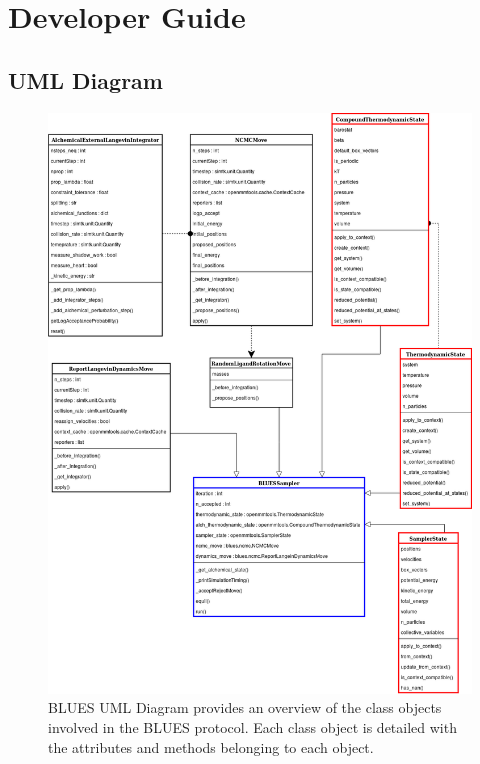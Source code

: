 \hypertarget{developer-guide}{%
\section{Developer Guide}\label{developer-guide}}

\hypertarget{uml-diagram}{%
\subsection{UML Diagram}\label{uml-diagram}}

\begin{figure}
    \centering
    \includegraphics[width=\textwidth,height=\textheight,keepaspectratio]{blues-docs/images/uml.png}
\caption[BLUES UML Diagram]{BLUES UML Diagram provides an overview of the class objects involved in the BLUES protocol. Each class object is detailed with the attributes and methods belonging to each object.}
\label{fig:blues-uml}
\end{figure}

